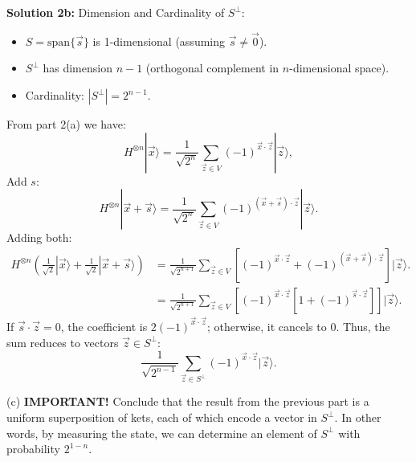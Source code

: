 \documentclass{article}
\begin{document}
\textbf{Solution 2b:} Dimension and Cardinality of \(S^\perp\):\\
\begin{itemize}
    \item \(S = \text{span}\{\vec{s}\}\) is 1-dimensional (assuming \(\vec{s} \neq \vec{0}\)).
    \item \(S^\perp\) has dimension \(n - 1\) (orthogonal complement in \(n\)-dimensional space).
    \item Cardinality: \(|S^\perp| = 2^{n-1}\).
\end{itemize}
From part 2(a) we have: $$H^{\otimes n}|\vec{x}\rangle = \frac{1}{\sqrt{2^n}} \sum_{\vec{z} \in V} (-1)^{\vec{x} \cdot \vec{z}} |\vec{z}\rangle,$$
Add $s$: $$H^{\otimes n}|\vec{x} + \vec{s}\rangle = \frac{1}{\sqrt{2^n}} \sum_{\vec{z} \in V} (-1)^{(\vec{x} + \vec{s}) \cdot \vec{z}} |\vec{z}\rangle.$$
Adding both: 
\begin{align*}
    H^{\otimes n}\left(\frac{1}{\sqrt{2}}|\vec{x}\rangle + \frac{1}{\sqrt{2}}|\vec{x} + \vec{s}\rangle\right) &= \frac{1}{\sqrt{2^{n+1}}} \sum_{\vec{z} \in V} \left[(-1)^{\vec{x} \cdot \vec{z}} + (-1)^{(\vec{x} + \vec{s}) \cdot \vec{z}}\right] |\vec{z}\rangle.\\
    &=\frac{1}{\sqrt{2^{n+1}}} \sum_{\vec{z} \in V} \left[(-1)^{\vec{x} \cdot \vec{z}} \left[1 + (-1)^{\vec{s} \cdot \vec{z}}\right]\right] |\vec{z}\rangle.
\end{align*}
If \(\vec{s} \cdot \vec{z} = 0\), the coefficient is \(2(-1)^{\vec{x} \cdot \vec{z}}\); otherwise, it cancels to 0. Thus, the sum reduces to vectors \(\vec{z} \in S^\perp\):
$$\boxed{
\frac{1}{\sqrt{2^{n-1}}} \sum_{\vec{z} \in S^\perp} (-1)^{\vec{x} \cdot \vec{z}} |\vec{z}\rangle.}$$

\newpage
\begin{question}[title=QUESTION 2c]
(c) \textbf{IMPORTANT!} Conclude that the result from the previous part is a uniform superposition of kets, each of which encode a vector in \(S^{\perp}\). In other words, by measuring the state, we can determine an element of \(S^{\perp}\) with probability \(2^{1-n}\).
\end{question}
\end{document}
